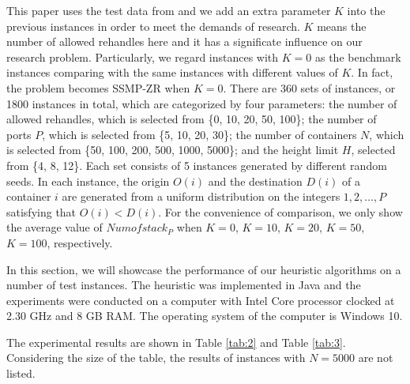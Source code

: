 \documentclass[review,3p,times,authoryear,12pt]{elsarticle}
\begin{document}
This paper uses the test data from \cite{wang2014stowage} and we add an extra parameter $K$ into the previous instances in order to meet the demands of research.
$K$ means the number of allowed rehandles here and it has a significate influence on our research problem.
Particularly, we regard instances with $K=0$ as the benchmark instances comparing with the same instances with different values of $K$.
In fact, the problem becomes SSMP-ZR when $K=0$.
There are 360 sets of instances, or 1800 instances in total, which are categorized by four parameters: the number of allowed rehandles, which is selected from \{0, 10, 20, 50, 100\};
the number of ports $P$, which is selected from \{5, 10, 20, 30\};
the number of containers $N$, which is selected from \{50, 100, 200, 500, 1000, 5000\};
and the height limit $H$, selected from \{4, 8, 12\}.
Each set consists of 5 instances generated by different random seeds.
In each instance, the origin $O(i)$ and the destination $D(i)$ of a container $i$ are generated from a uniform distribution on the integers $1, 2, \ldots, P$ satisfying that $O(i)<D(i)$.
For the convenience of comparison, we only show the average value of $Numofstack_P$ when $K=0$, $K=10$, $K=20$, $K=50$, $K=100$, respectively.

In this section, we will showcase the performance of our heuristic algorithms on a number of test instances.
The heuristic was implemented in Java and the experiments were conducted on a computer with Intel Core processor clocked at 2.30 GHz and 8 GB RAM.
The operating system of the computer is Windows 10.

The experimental results are shown in Table \ref{tab:2} and Table \ref{tab:3}.
Considering the size of the table, the results of instances with $N=5000$ are not listed.
\end{document}

